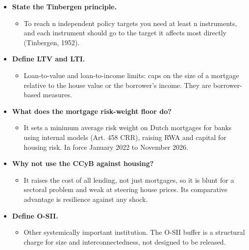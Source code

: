 \documentclass[10pt]{article}
\begin{document}
\begin{tcolorbox}[sbox,width=0.495\linewidth,height=14.6cm,nobeforeafter,box align=top,fit basedim=11pt,colframe=nlred!70,colbacktitle=nlred!8,coltitle=nlred,title=LIKELY CHALLENGES · definitions and logic]
\begin{itemize}
\item[\textcolor{navy}{\textbf{Q}}] \textbf{State the Tinbergen principle.}
\begin{itemize}
\item To reach n independent policy targets you need at least n instruments, and each instrument should go to the target it affects most directly (Tinbergen, 1952).
\end{itemize}
\item[\textcolor{navy}{\textbf{Q}}] \textbf{Define LTV and LTI.}
\begin{itemize}
\item Loan-to-value and loan-to-income limits: caps on the size of a mortgage relative to the house value or the borrower's income. They are borrower-based measures.
\end{itemize}
\item[\textcolor{navy}{\textbf{Q}}] \textbf{What does the mortgage risk-weight floor do?}
\begin{itemize}
\item It sets a minimum average risk weight on Dutch mortgages for banks using internal models (Art. 458 CRR), raising RWA and capital for housing risk. In force January 2022 to November 2026.
\end{itemize}
\item[\textcolor{navy}{\textbf{Q}}] \textbf{Why not use the CCyB against housing?}
\begin{itemize}
\item It raises the cost of all lending, not just mortgages, so it is blunt for a sectoral problem and weak at steering house prices. Its comparative advantage is resilience against any shock.
\end{itemize}
\item[\textcolor{navy}{\textbf{Q}}] \textbf{Define O-SII.}
\begin{itemize}
\item Other systemically important institution. The O-SII buffer is a structural charge for size and interconnectedness, not designed to be released.
\end{itemize}
\end{itemize}
\end{tcolorbox}
\newpage
\end{document}
